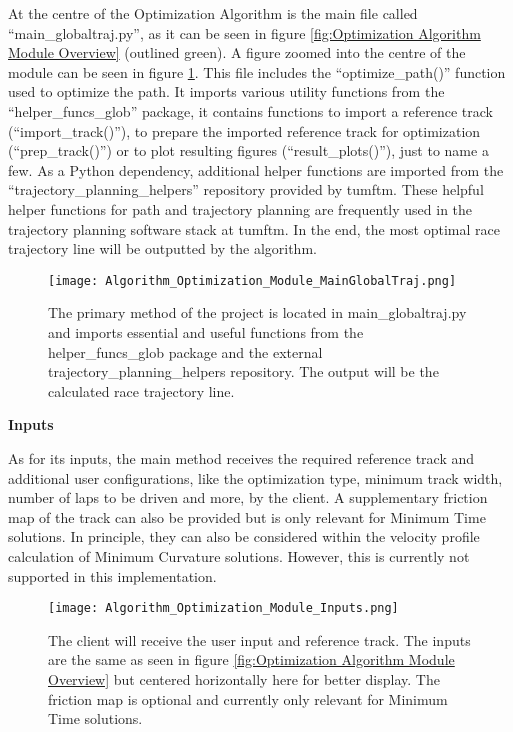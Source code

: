 At the centre of the Optimization Algorithm is the main file called ``main\_globaltraj.py'', as it can be seen in figure \ref{fig:Optimization Algorithm Module Overview} (outlined green). A figure zoomed into the centre of the module can be seen in figure \ref{fig:Optimization Algorithm Module MainGlobalTraj}. This file includes the ``optimize\_path()'' function used to optimize the path. It imports various utility functions from the ``helper\_funcs\_glob'' package, it contains functions to import a reference track (``import\_track()''), to prepare the imported reference track for optimization (``prep\_track()'') or to plot resulting figures (``result\_plots()''), just to name a few. As a Python dependency, additional helper functions are imported from the ``trajectory\_planning\_helpers'' repository provided by \acrshort{tumftm}. \cite{tumftm_trajectory_planning_helpers}
These helpful helper functions for path and trajectory planning are frequently used in the trajectory planning software stack at \acrshort{tumftm}.
In the end, the most optimal race trajectory line will be outputted by the algorithm. 
\begin{figure}[H]
    \centering
    \texttt{[image: Algorithm\_Optimization\_Module\_MainGlobalTraj.png]}
    \caption{The primary method of the project is located in main\_globaltraj.py and imports essential and useful functions from the helper\_funcs\_glob package and the external trajectory\_planning\_helpers repository. The output will be the calculated race trajectory line.}
    \label{fig:Optimization Algorithm Module MainGlobalTraj}
\end{figure}

\textbf{Inputs}

As for its inputs, the main method receives the required reference track and additional user configurations, like the optimization type, minimum track width, number of laps to be driven and more, by the client. A supplementary friction map of the track can also be provided but is only relevant for Minimum Time solutions. In principle, they can also be considered within the velocity profile calculation of Minimum Curvature solutions. However, this is currently not supported in this implementation. \cite{tumftm_optimization_algoritm}
\begin{figure}[H]
    \centering
    \texttt{[image: Algorithm\_Optimization\_Module\_Inputs.png]}
    \caption{The client will receive the user input and reference track. The inputs are the same as seen in figure \ref{fig:Optimization Algorithm Module Overview} but centered horizontally here for better display. The friction map is optional and currently only relevant for Minimum Time solutions.}
    \label{fig:Optimization Algorithm Module Inputs}
\end{figure}

